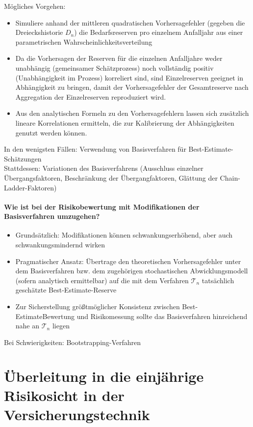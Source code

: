 \documentclass[12pt]{report}
\theoremstyle{dotless}
\theoremstyle{definition}
\begin{document}
\vspace{1cm}
Mögliches Vorgehen:
\begin{itemize}
\item Simuliere anhand der mittleren quadratischen Vorhersagefehler (gegeben die Dreieckshistorie $D_n$) die Bedarfsreserven pro einzelnem Anfalljahr aus einer parametrischen Wahrscheinlichkeitsverteilung
\item Da die Vorhersagen der Reserven für die einzelnen Anfalljahre weder unabhängig (gemeinsamer
Schätzprozess) noch vollständig positiv (Unabhängigkeit im Prozess) korreliert sind, sind Einzelreserven geeignet in Abhängigkeit zu bringen, damit der Vorhersagefehler der Gesamtreserve nach Aggregation der Einzelreserven reproduziert wird.
\item Aus den analytischen Formeln zu den Vorhersagefehlern lassen sich zusätzlich lineare Korrelationen ermitteln, die zur Kalibrierung der Abhängigkeiten genutzt werden können.
\end{itemize} 

In den wenigsten Fällen: Verwendung von Basisverfahren für Best-Estimate-Schätzungen \\
Stattdessen: Variationen des Basisverfahrens (Ausschluss einzelner Übergangsfaktoren, Beschränkung der Übergangfaktoren, Glättung der Chain-Ladder-Faktoren)

\subsubsection{Wie ist bei der Risikobewertung mit Modifikationen der
Basisverfahren umzugehen?}
\begin{itemize}
\item Grundsätzlich: Modifikationen können schwankungserhöhend, aber auch
schwankungsmindernd wirken
\item Pragmatischer Ansatz: Übertrage den theoretischen Vorhersagefehler
unter dem Basisverfahren bzw. dem zugehörigen stochastischen
Abwicklungsmodell (sofern analytisch ermittelbar) auf die mit dem Verfahren $\mathcal{T}_n$ tatsächlich geschätzte Best-Estimate-Reserve
\item Zur Sicherstellung größtmöglicher Konsistenz zwischen Best-EstimateBewertung und Risikomessung sollte das Basisverfahren hinreichend nahe
an $\mathcal{T}_n$ liegen
\end{itemize}

Bei Schwierigkeiten: Bootstrapping-Verfahren


\chapter{Überleitung in die einjährige Risikosicht in der Versicherungstechnik}
\end{document}
